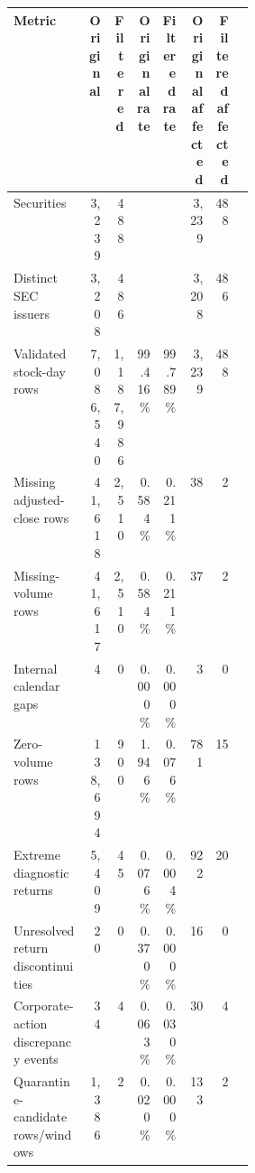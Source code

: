 \begin{tabular}{@{}p{0.31\linewidth}rrrrrrr@{}}
\toprule
Metric & Original & Filtered & Original rate & Filtered rate & Original affected & Filtered affected \\
\midrule
Securities & 3,239 & 488 &  &  & 3,239 & 488 \\
Distinct SEC issuers & 3,208 & 486 &  &  & 3,208 & 486 \\
Validated stock-day rows & 7,086,540 & 1,187,986 & 99.416\% & 99.789\% & 3,239 & 488 \\
Missing adjusted-close rows & 41,618 & 2,510 & 0.584\% & 0.211\% & 38 & 2 \\
Missing-volume rows & 41,617 & 2,510 & 0.584\% & 0.211\% & 37 & 2 \\
Internal calendar gaps & 4 & 0 & 0.000\% & 0.000\% & 3 & 0 \\
Zero-volume rows & 138,694 & 900 & 1.946\% & 0.076\% & 781 & 15 \\
Extreme diagnostic returns & 5,409 & 45 & 0.076\% & 0.004\% & 922 & 20 \\
Unresolved return discontinuities & 20 & 0 & 0.370\% & 0.000\% & 16 & 0 \\
Corporate-action discrepancy events & 34 & 4 & 0.063\% & 0.030\% & 30 & 4 \\
Quarantine-candidate rows/windows & 1,386 & 2 & 0.020\% & 0.000\% & 133 & 2 \\
\bottomrule
\end{tabular}
